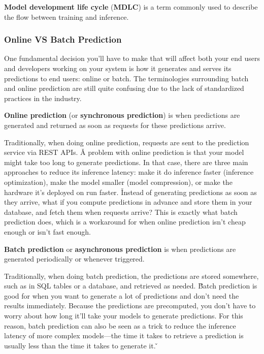 \textbf{Model development life cycle} (\textbf{MDLC}) is a term commonly used to describe the flow between training and
inference.
\ed


\subsubsection{Online VS Batch Prediction}

One fundamental decision you'll have to make that will affect both your end users and developers working on your
system is how it generates and serves its predictions to end users: online or batch. The terminologies surrounding
batch and online prediction are still quite confusing due to the lack of standardized practices in the industry.

\textbf{Online prediction} (or \textbf{synchronous prediction}) is when predictions are generated and returned as soon
as requests for these predictions arrive.
\ed


Traditionally, when doing online prediction, requests are sent to the prediction service via REST APIs. \v

A problem with online prediction is that your model might take too long to generate predictions. In that case, there are
three main approaches to reduce its inference latency: make it do inference faster (inference optimization), make the
model smaller (model compression), or make the hardware it's deployed on run faster. \v

Instead of generating predictions as soon as they arrive, what if you compute predictions in advance and store them
in your database, and fetch them when requests arrive? This is exactly what batch prediction does, which is a
workaround for when online prediction isn't cheap enough or isn't fast enough.

\textbf{Batch prediction} or \textbf{asynchronous prediction} is when predictions are generated periodically or whenever
triggered.
\ed


Traditionally, when doing batch prediction, the predictions are stored somewhere, such as in SQL tables or a database,
and retrieved as needed. \v

Batch prediction is good for when you want to generate a lot of predictions and don't need the results immediately.
Because the predictions are precomputed, you don't have to worry about how long it'll take your models to generate
predictions. For this reason, batch prediction can also be seen as a trick to reduce the inference latency of more
complex models—the time it takes to retrieve a prediction is usually less than the time it takes to generate it. \v

